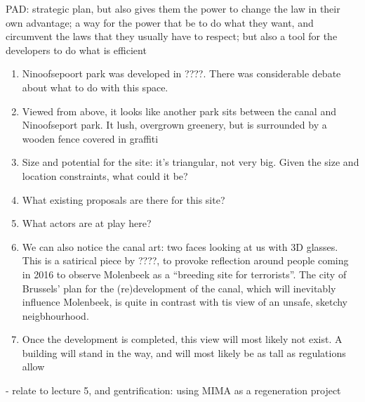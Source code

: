 \documentclass{article}[11pt]
\begin{document}

PAD: strategic plan, but also gives them the power to change the law in their own advantage; a way for the power that be to do what they want, and circumvent the laws that they usually have to respect; but also a tool for the developers to do what is efficient

\begin{enumerate}
	\item Ninoofsepoort park was developed in ????. There was considerable debate about what to do with this space.
	\\ 
	\item Viewed from above, it looks like another park sits between the canal and Ninoofseport park. It lush, overgrown greenery, but is surrounded by a wooden fence covered in graffiti 
	\item Size and potential for the site: it's triangular, not very big. Given the size and location constraints, what could it be?
	\item What existing proposals are there for this site?
	\item What actors are at play here?
	\item We can also notice the canal art: two faces looking at us with 3D glasses. This is a satirical piece by ????, to provoke reflection around people coming in 2016 to observe Molenbeek as a ``breeding site for terrorists''. The city of Brussels' plan for the (re)development of the canal, which will inevitably influence Molenbeek, is quite in contrast with tis view of an unsafe, sketchy neigbhourhood.
	\item Once the development is completed, this view will most likely not exist. A building will stand in the way, and will most likely be as tall as regulations allow
	
\end{enumerate}

- relate to lecture 5, and gentrification: using MIMA as a regeneration project

\pagebreak

\printbibliography 
\end{document}
